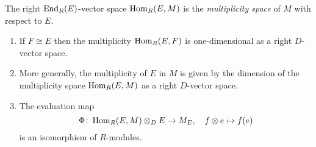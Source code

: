 \begin{definition}
  The right $\operatorname{End}_R(E)$-vector space $\operatorname{Hom}_R(E,M)$ is the \emph{multiplicity space} of $M$ with respect to $E$.
\end{definition}


\begin{proposition}
    \leavevmode
    \begin{enumerate}
    \item
      \label{enumerate: one-dimensional as D vector space}
      If $F \cong E$ then the multiplicity $\operatorname{Hom}_R(E,F)$ is one-dimensional as a right $D$-vector space.
    \item
      \label{enumerate: multiplicity is dimension}
      More generally, the multiplicity of $E$ in $M$ is given by the dimension of the multiplicity space $\operatorname{Hom}_R(E,M)$ as a right $D$-vector space.
    \item
      The evaluation map
      \[
                \Phi
        \colon  \operatorname{Hom}_R(E,M) \otimes_D E
        \to     M_E,
        \quad   f \otimes e
        \mapsto f(e)
      \]
      is an isomorphism of $R$-modules.
  \end{enumerate}
\end{proposition}


